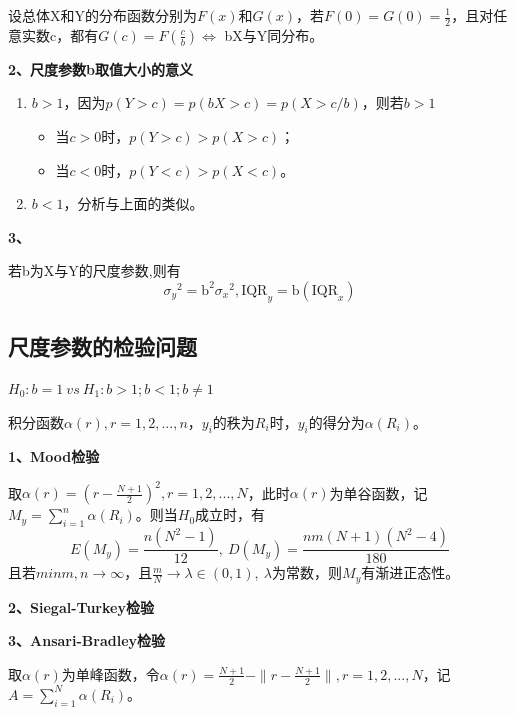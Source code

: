 \documentclass[lang=cn,10pt]{elegantbook}
\begin{document}
\begin{theorem}
    设总体X和Y的分布函数分别为$F(x)$和$G(x)$，若$F(0) = G(0) = \frac12$，且对任意实数c，都有$G(c) = F(\frac{c}b) \Longleftrightarrow $ bX与Y同分布。
\end{theorem}

\textbf{2、尺度参数b取值大小的意义}
\begin{enumerate}[(1)]
    \item $b > 1$，因为$p(Y>c)=p(bX>c)=p(X>c/b)$，则若$b>1$
    \begin{itemize}
        \item 当$c>0$时，$p(Y>c)>p(X>c)$；
        \item 当$c<0$时，$p(Y<c)>p(X<c)$。
    \end{itemize}
    \item $b<1$，分析与上面的类似。
\end{enumerate}

\textbf{3、}

若b为X与Y的尺度参数,则有
\begin{equation}
    {\sigma_y}^2={\mathrm{b}}^2{\sigma_x}^2,{\mathrm{IQR}}_y={\mathrm{b}}({\mathrm{IQR}}_x)
\end{equation}

\subsection{尺度参数的检验问题}
\begin{center}
    $H_0: b = 1 ~vs~ H_1: b > 1; b < 1; b \neq 1$ 
\end{center}
\begin{definition}
    积分函数$\alpha(r),r = 1,2,...,n$，$y_i$的秩为$R_i$时，$y_i$的得分为$\alpha(R_i)$。
\end{definition}

\textbf{1、Mood检验}

取$\alpha(r) = (r - \frac{N+1}2)^2,r = 1,2,...,N$，此时$\alpha(r)$为单谷函数，记$M_y = \sum_{i = 1}^n\alpha(R_i)$。则当$H_0$成立时，有
\begin{equation}
    E(M_y) = \frac{n(N^2-1)}{12}, ~ D(M_y) = \frac{nm(N+1)(N^2-4)}{180}
\end{equation}
且若$min{m,n} \rightarrow \infty$，且$\frac{m}N \rightarrow \lambda \in (0,1),~\lambda$为常数，则$M_y$有渐进正态性。

\textbf{2、Siegal-Turkey检验}

\textbf{3、Ansari-Bradley检验}

取$\alpha(r)$为单峰函数，令$\alpha(r) = \frac{N+1}2 - \|r - \frac{N+1}2\|,r = 1,2,...,N$，记$A = \sum_{i = 1}^N\alpha(R_i)$。
\end{document}
